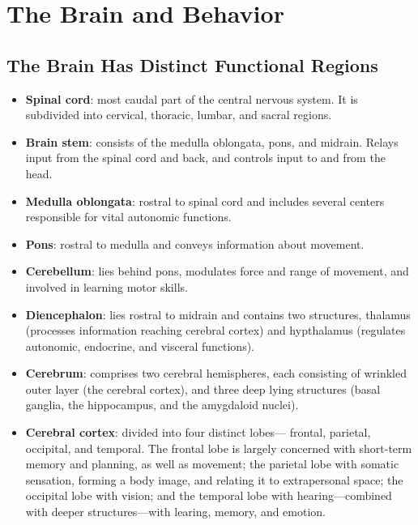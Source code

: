 \documentclass[12pt,a4paper]{article}
\begin{document}
\tableofcontents
\cleardoublepage
\fancyhead{}

\clearpage
\section{The Brain and Behavior}


\subsection{The Brain Has Distinct Functional Regions}
\begin{itemize}
    \item \textbf{Spinal cord}: most caudal part of the central nervous system. It is subdivided into cervical, thoracic, lumbar, and sacral regions.
    \item \textbf{Brain stem}: consists of the medulla oblongata, pons, and midrain. Relays input from the spinal cord and back, and controls input to and from the head.
    \item \textbf{Medulla oblongata}: rostral to spinal cord and includes several centers responsible for vital autonomic functions. 
    \item \textbf{Pons}: rostral to medulla and conveys information about movement.
    \item \textbf{Cerebellum}: lies behind pons, modulates force and range of movement, and involved in learning motor skills.
    \item \textbf{Diencephalon}: lies rostral to midrain and contains two structures, thalamus (processes information reaching cerebral cortex) and hypthalamus (regulates autonomic, endocrine, and visceral functions).
    \item \textbf{Cerebrum}: comprises two cerebral hemispheres, each consisting of wrinkled outer layer (the cerebral cortex), and three deep lying structures (basal ganglia, the hippocampus, and the amygdaloid nuclei).
    \item \textbf{Cerebral cortex}: divided into four distinct lobes--- frontal, parietal, occipital, and temporal. The frontal lobe is largely concerned with short-term memory and planning, as well as movement; the parietal lobe with somatic sensation, forming a body image, and relating it to extrapersonal space; the occipital lobe with vision; and the temporal lobe with hearing---combined with deeper structures---with learing, memory, and emotion.
\end{itemize}
\end{document}
